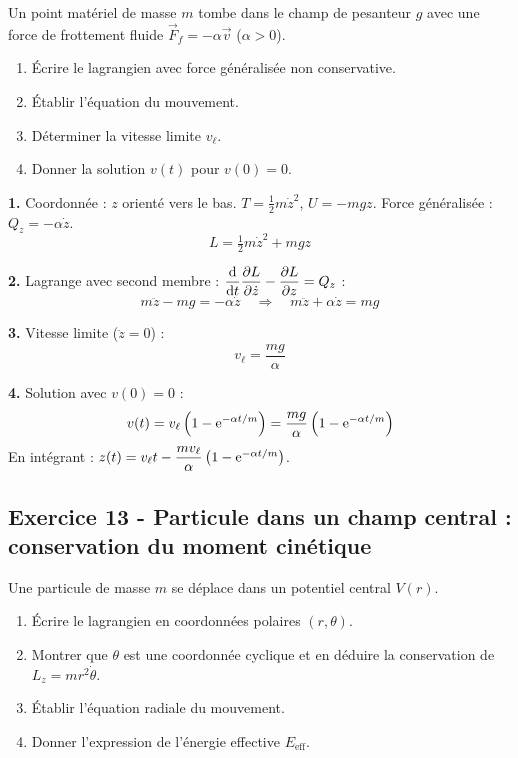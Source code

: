 \documentclass[12pt,a4paper]{article}
\begin{document}
\begin{boiteexercice}
Un point matériel de masse $m$ tombe dans le champ de pesanteur $g$ avec une force de frottement fluide $\vec{F}_f = -\alpha\vec{v}$ ($\alpha > 0$).
\begin{enumerate}
  \item Écrire le lagrangien avec force généralisée non conservative.
  \item Établir l'équation du mouvement.
  \item Déterminer la vitesse limite $v_\ell$.
  \item Donner la solution $v(t)$ pour $v(0) = 0$.
\end{enumerate}
\end{boiteexercice}

\begin{boitecorrige}
\textbf{1.} Coordonnée : $z$ orienté vers le bas. $T = \tfrac{1}{2}m\dot z^2$, $U = -mgz$. Force généralisée : $Q_z = -\alpha\dot z$.
\[
L = \tfrac{1}{2}m\dot z^2 + mgz
\]

\textbf{2.} Lagrange avec second membre : $\dfrac{\mathrm{d}}{\mathrm{d} t}\dfrac{\partial L}{\partial\dot z} - \dfrac{\partial L}{\partial z} = Q_z$ :
\[
m\ddot z - mg = -\alpha\dot z \quad\Longrightarrow\quad m\ddot z + \alpha\dot z = mg
\]

\textbf{3.} Vitesse limite ($\ddot z = 0$) :
\[
v_\ell = \frac{mg}{\alpha}
\]

\textbf{4.} Solution avec $v(0) = 0$ :
\[
v(t) = v_\ell\left(1 - \mathrm{e}^{-\alpha t/m}\right) = \frac{mg}{\alpha}\left(1 - \mathrm{e}^{-\alpha t/m}\right)
\]
En intégrant : $z(t) = v_\ell t - \dfrac{m v_\ell}{\alpha}\left(1 - \mathrm{e}^{-\alpha t/m}\right)$.
\end{boitecorrige}

\subsection*{Exercice 13 - Particule dans un champ central : conservation du moment cinétique \niveau{\difficile}}

\begin{boiteexercice}
Une particule de masse $m$ se déplace dans un potentiel central $V(r)$.
\begin{enumerate}
  \item Écrire le lagrangien en coordonnées polaires $(r, \theta)$.
  \item Montrer que $\theta$ est une coordonnée cyclique et en déduire la conservation de $L_z = mr^2\dot\theta$.
  \item Établir l'équation radiale du mouvement.
  \item Donner l'expression de l'énergie effective $E_\text{eff}$.
\end{enumerate}
\end{boiteexercice}
\end{document}
